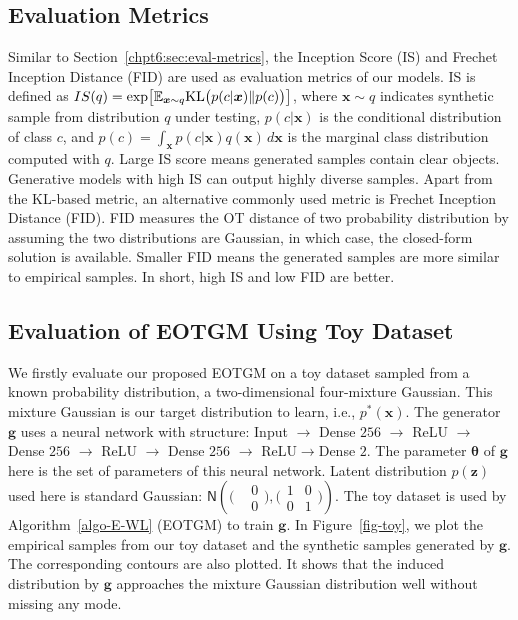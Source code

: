 \subsection{Evaluation Metrics}\label{subsec-metric}
Similar to Section~\ref{chpt6:sec:eval-metrics}, the Inception Score (IS) \cite{NIPS2016_6125} and Frechet Inception Distance (FID)\cite{2017arXiv170608500H} are used as evaluation metrics of our models. IS is defined as $
  IS(q) = \exp\bigl[ \mathbb{E}_{\bm{x} \sim q} \mathrm{KL}\bigl( p(c | \bm{x})\| p(c) \bigr)  \bigr]$,
where $\bm{x}\sim q$ indicates synthetic sample from distribution $q$ under testing, $p(c|\bm{x})$ is the conditional distribution of class $c$, and $p(c) = \int_{\bm{x}}p(c|\bm{x})q(\bm{x}) \,d \bm{x} $ is the marginal class distribution computed with $q$. Large IS score means generated samples contain clear objects. Generative models with high IS can output highly diverse samples. Apart from the KL-based metric, an alternative commonly used metric is Frechet Inception Distance (FID)\cite{2017arXiv170608500H}. FID measures the OT distance of two probability distribution by assuming the two distributions are Gaussian, in which case, the closed-form solution is available. Smaller FID means the generated samples are more similar to empirical samples. In short, high IS and low FID are better.


\subsection{Evaluation of EOTGM Using Toy Dataset}\label{subsec-mg}

{We firstly evaluate our proposed EOTGM on a toy dataset sampled from a known probability distribution, a two-dimensional four-mixture Gaussian. This mixture Gaussian is our target distribution to learn, i.e., $p^{\ast}(\bm{x})$. The generator $\bm{g}$ uses a neural network with structure: Input $\rightarrow$ Dense $256$ $\rightarrow$ ReLU $\rightarrow$ Dense $256$ $\rightarrow$ ReLU $\rightarrow$ Dense $256$ $\rightarrow$ ReLU$\rightarrow$Dense $2$. The parameter $\bm{\theta} $ of $\bm{g}$ here is the set of parameters of this neural network. Latent distribution $p(\bm{z})$ used here is standard Gaussian: $\mathsf{N}\left(\bigl(\begin{smallmatrix}& 0\\
    &0\end{smallmatrix}\bigr) ,\bigl( \begin{smallmatrix}1 & 0\\ 0 &
    1\end{smallmatrix}  \bigr)\right)$.
The toy dataset is used by Algorithm~\ref{algo-E-WL} (EOTGM) to train $\bm{g}$. In Figure~\ref{fig-toy}, we plot the empirical samples from our toy dataset and the synthetic samples generated by $\bm{g}$. The corresponding contours are also plotted. It shows that the induced distribution by $\bm{g}$ approaches the mixture Gaussian distribution well without missing any mode.}          

